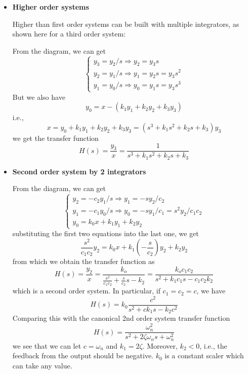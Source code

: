\begin{itemize}
\item {\bf Higher order systems}

Higher than first order systems can be built with multiple integrators, as shown here for
a third order system:


From the diagram, we can get
\[
\left\{ \begin{array}{l}
	y_3=y_2/s \Longrightarrow y_2=y_3s	\\
	y_2=y_1/s \Longrightarrow y_1=y_2s=y_3s^2	\\
	y_1=y_0/s \Longrightarrow y_0=y_1s=y_3s^3	
\end{array} \right.
\]
But we also have
\[	y_0=x-(k_1y_1+k_2y_2+k_3y_3)	\]
i.e., 
\[	x=y_0+k_1y_1+k_2y_2+k_3y_3=(s^3+k_1s^2+k_2s+k_3) y_3	\]
we get the transfer function
\[
	H(s)=\frac{y_3}{x}=\frac{1}{s^3+k_1s^2+k_2s+k_3}
\]


\item {\bf Second order system by 2 integrators}


From the diagram, we can get
\[
\left\{ \begin{array}{ll}
	y_2=-c_2y_1/s  \Longrightarrow  y_1=-sy_2/c_2 \\
	y_1=-c_1y_0/s  \Longrightarrow y_0=-sy_1/c_1=s^2y_2/c_1c_2 \\
	y_0=k_0 x+k_1y_1+k_2y_2 
	\end{array} \right.
\]
substituting the first two equations into the last one, we get
\[	\frac{s^2}{c_1c_2} y_2=k_0x+k_1(-\frac{s}{c_2})y_2+k_2y_2 \]
from which we obtain the transfer function as
\[
H(s)=\frac{y_2}{x}=\frac{k_o}{\frac{s^2}{c_1c_2}+\frac{s}{c_2}s-k_2}
	=\frac{k_oc_1c_2}{s^2+k_1c_1s-c_1c_2k_2}
\]
which is a second order system. In particular, if $c_1=c_2=c$, we have
\[
	H(s)=k_0\frac{c^2}{s^2+c k_1s-k_2c^2}
\]
Comparing this with the canonical 2nd order system transfer function
\[
	H(s)=\frac{\omega_n^2}{s^2+2\zeta \omega_n s+\omega_n^2}
\]
we see that we can let $c=\omega_n$ and $k_1=2\zeta$. Moreover, $k_2<0$, 
i.e., the feedback from the output should be negative. $k_0$ is a constant
scaler which can take any value.
	
\end{itemize}




	

	












